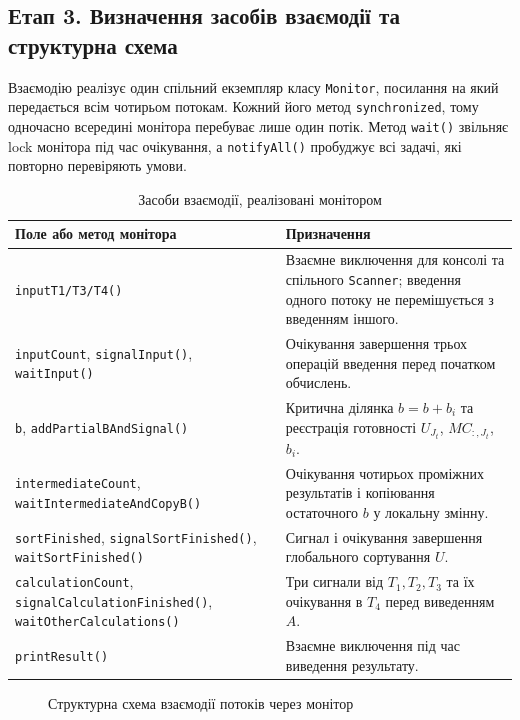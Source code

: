 \documentclass[12pt,a4paper]{article}
\begin{document}
\subsection{Етап 3. Визначення засобів взаємодії та структурна схема}
Взаємодію реалізує один спільний екземпляр класу \texttt{Monitor}, посилання
на який передається всім чотирьом потокам. Кожний його метод
\texttt{synchronized}, тому одночасно всередині монітора перебуває лише один
потік. Метод \texttt{wait()} звільняє lock монітора під час очікування, а
\texttt{notifyAll()} пробуджує всі задачі, які повторно перевіряють умови.

\begin{table}[H]
\centering\footnotesize\renewcommand{\arraystretch}{1.15}
\begin{tabular}{|p{4.9cm}|p{9.5cm}|}\hline
\textbf{Поле або метод монітора}&\textbf{Призначення}\\\hline
\texttt{inputT1/T3/T4()}&Взаємне виключення для консолі та спільного \texttt{Scanner}; введення одного потоку не перемішується з введенням іншого.\\\hline
\texttt{inputCount}, \texttt{signalInput()}, \texttt{waitInput()}&Очікування завершення трьох операцій введення перед початком обчислень.\\\hline
\texttt{b}, \texttt{addPartialBAndSignal()}&Критична ділянка $b=b+b_i$ та реєстрація готовності $U_{J_t}$, $MC_{:,J_t}$, $b_i$.\\\hline
\texttt{intermediateCount}, \texttt{waitIntermediateAndCopyB()}&Очікування чотирьох проміжних результатів і копіювання остаточного $b$ у локальну змінну.\\\hline
\texttt{sortFinished}, \texttt{signalSortFinished()}, \texttt{waitSortFinished()}&Сигнал і очікування завершення глобального сортування $U$.\\\hline
\texttt{calculationCount}, \texttt{signalCalculationFinished()}, \texttt{waitOtherCalculations()}&Три сигнали від $T_1,T_2,T_3$ та їх очікування в $T_4$ перед виведенням $A$.\\\hline
\texttt{printResult()}&Взаємне виключення під час виведення результату.\\\hline
\end{tabular}
\caption{Засоби взаємодії, реалізовані монітором}
\label{tab:monitor}
\end{table}

\begin{figure}[H]
\centering
\resizebox{\textwidth}{!}{}
\caption{Структурна схема взаємодії потоків через монітор}
\label{fig:interaction}
\end{figure}
\end{document}

